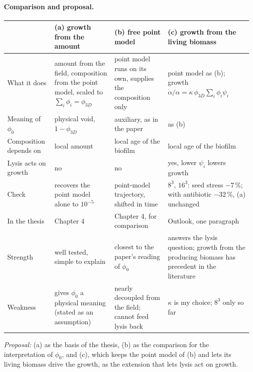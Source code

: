 \documentclass[11pt,a4paper]{article}
\begin{document}
\par\noindent\begin{minipage}{\linewidth}
\paragraph{Comparison and proposal.}
\begin{center}\small
\begin{tabularx}{\linewidth}{@{}l>{\raggedright\arraybackslash}X>{\raggedright\arraybackslash}X>{\raggedright\arraybackslash}X@{}}
\toprule
& (a) growth from the amount & (b) free point model & (c) growth from the living biomass\\
\midrule
What it does & amount from the field, composition from the point model, scaled to $\sum_i\phi_i=\phi_{3D}$ & point model runs on its own, supplies the composition only & point model as (b); growth $\dot\alpha/\alpha=\kappa\,\phi_{3D}\sum_i\phi_i\psi_i$\\
Meaning of $\phi_0$ & physical void, $1-\phi_{3D}$ & auxiliary, as in the paper & as (b)\\
Composition depends on & local amount & local age of the biofilm & local age of the biofilm\\
Lysis acts on growth & no & no & yes, lower $\psi_i$ lowers growth\\
Check & recovers the point model alone to $10^{-5}$ & point-model trajectory, shifted in time & $8^3$, $16^3$: seed stress $-7\,\%$; with antibiotic $-32\,\%$, (a) unchanged\\
In the thesis & Chapter 4 & Chapter 4, for comparison & Outlook, one paragraph\\
Strength & well tested, simple to explain & closest to the paper's reading of $\phi_0$ & answers the lysis question; growth from the producing biomass has precedent in the literature\\
Weakness & gives $\phi_0$ a physical meaning (stated as an assumption) & nearly decoupled from the field; cannot feed lysis back & $\kappa$ is my choice; $8^3$ only so far\\
\bottomrule
\end{tabularx}
\end{center}
\noindent\emph{Proposal:} (a) as the basis of the thesis, (b) as the comparison for the
interpretation of $\phi_0$, and (c), which keeps the point model of (b) and lets its
living biomass drive the growth, as the extension that lets lysis act on growth.
\end{minipage}
\end{document}
